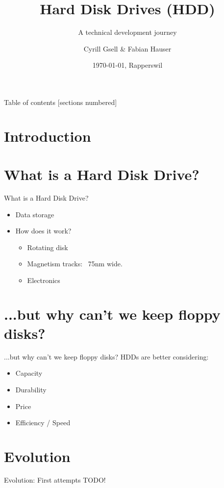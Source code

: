\documentclass[12pt]{beamer}
\title{Hard Disk Drives (HDD)}
\subtitle{A technical development journey}
\date{\today, Rapperswil}
\author{Cyrill Gsell \& Fabian Hauser}
\institute{Computer Science \\
	TecBEC Presentation FS 2016}
\newlength{\wideitemsep}
\let\olditem\item
\renewcommand{\item}{\setlength{\itemsep}{\wideitemsep}\olditem}
\begin{document}
\maketitle

\begin{frame}{Table of contents}
  [sections numbered]
  \tableofcontents
\end{frame}

\section{Introduction}
\section{What is a Hard Disk Drive?}
\begin{frame}[fragile]{What is a Hard Disk Drive?}
	\begin{itemize}
		\item Data storage
		\item How does it work?
			\begin{itemize}
				\item Rotating disk
				\item Magnetism tracks: ~75nm wide.
				\item Electronics
			\end{itemize}
	\end{itemize}
\end{frame}

\section{...but why can't we keep floppy disks?}
\begin{frame}[fragile]{...but why can't we keep floppy disks?}
	HDDs are better considering:
	\begin{itemize}
		\item Capacity
		\item Durability
		\item Price
		\item Efficiency / Speed
	\end{itemize}		
\end{frame}

\section{Evolution}
\begin{frame}[fragile]{Evolution: First attempts}
	TODO!
\end{frame}
\end{document}
